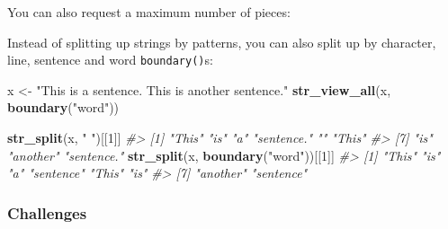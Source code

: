 \documentclass[]{book}
\newenvironment{Shaded}{\begin{snugshade}}{\end{snugshade}}
\newcommand{\CommentTok}[1]{\textcolor[rgb]{0.56,0.35,0.01}{\textit{#1}}}
\newcommand{\DataTypeTok}[1]{\textcolor[rgb]{0.13,0.29,0.53}{#1}}
\newcommand{\DecValTok}[1]{\textcolor[rgb]{0.00,0.00,0.81}{#1}}
\newcommand{\KeywordTok}[1]{\textcolor[rgb]{0.13,0.29,0.53}{\textbf{#1}}}
\newcommand{\NormalTok}[1]{#1}
\newcommand{\OperatorTok}[1]{\textcolor[rgb]{0.81,0.36,0.00}{\textbf{#1}}}
\newcommand{\OtherTok}[1]{\textcolor[rgb]{0.56,0.35,0.01}{#1}}
\newcommand{\StringTok}[1]{\textcolor[rgb]{0.31,0.60,0.02}{#1}}
\begin{document}
You can also request a maximum number of pieces:

\begin{Shaded}
\end{Shaded}

Instead of splitting up strings by patterns, you can also split up by character, line, sentence and word \texttt{boundary()}s:

\begin{Shaded}
\begin{Highlighting}[]
\NormalTok{x <-}\StringTok{ "This is a sentence.  This is another sentence."}
\KeywordTok{str_view_all}\NormalTok{(x, }\KeywordTok{boundary}\NormalTok{(}\StringTok{"word"}\NormalTok{))}
\end{Highlighting}
\end{Shaded}

\hypertarget{htmlwidget-0caf26d4e3c00206b0c5}{}

\begin{Shaded}
\begin{Highlighting}[]
\KeywordTok{str_split}\NormalTok{(x, }\StringTok{" "}\NormalTok{)[[}\DecValTok{1}\NormalTok{]]}
\CommentTok{#> [1] "This"      "is"        "a"         "sentence." ""          "This"     }
\CommentTok{#> [7] "is"        "another"   "sentence."}
\KeywordTok{str_split}\NormalTok{(x, }\KeywordTok{boundary}\NormalTok{(}\StringTok{"word"}\NormalTok{))[[}\DecValTok{1}\NormalTok{]]}
\CommentTok{#> [1] "This"     "is"       "a"        "sentence" "This"     "is"      }
\CommentTok{#> [7] "another"  "sentence"}
\end{Highlighting}
\end{Shaded}

\hypertarget{challenges-19}{%
\subsubsection{Challenges}\label{challenges-19}}
\end{document}
